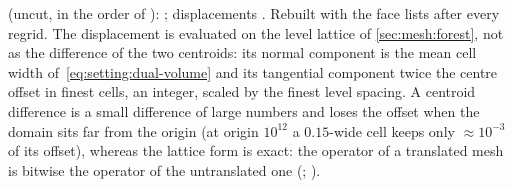 \begin{implnote}
 (uncut, in the order of ):
; displacements
. Rebuilt with the face
lists after every regrid. The displacement is evaluated on the level lattice of
\cref{sec:mesh:forest}, not as the difference of the two centroids: its normal
component is the mean cell width of~\cref{eq:setting:dual-volume} and its
tangential component twice the centre offset in finest cells, an integer,
scaled by the finest level spacing. A centroid difference is a small difference
of large numbers and loses the offset when the domain sits far from the origin
(at origin $10^{12}$ a $0.15$-wide cell keeps only $\approx10^{-3}$ of its
offset), whereas the lattice form is exact: the operator of a
translated mesh is bitwise the operator of the untranslated one
(;
).
\end{implnote}

